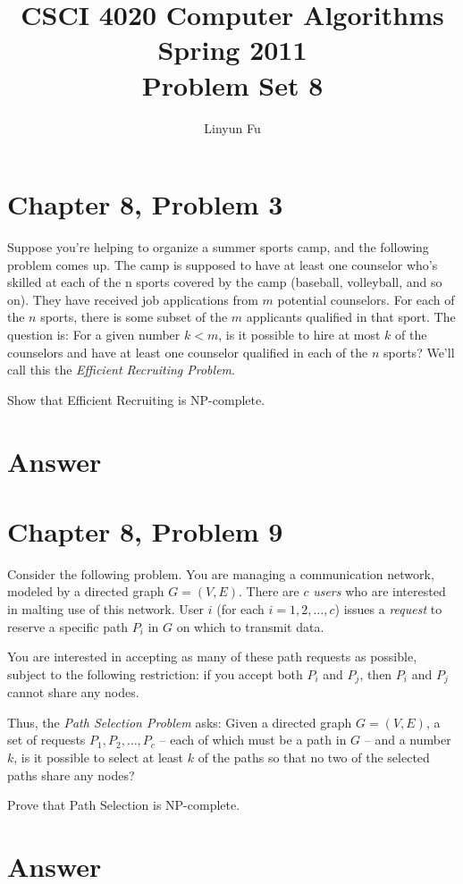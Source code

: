\documentclass[12pt,letterpaper]{article}
\author{Linyun Fu}
\title{CSCI 4020 Computer Algorithms Spring 2011\\
Problem Set 8}
\begin{document}
\maketitle
\section*{Chapter 8, Problem 3}
Suppose you're helping to organize a summer sports camp, and the
following problem comes up. The camp is supposed to have at least
one counselor who's skilled at each of the n sports covered by the camp
(baseball, volleyball, and so on). They have received job applications from
$m$ potential counselors. For each of the $n$ sports, there is some subset
of the $m$ applicants qualified in that sport. The question is: For a given
number $k < m$, is it possible to hire at most $k$ of the counselors and have
at least one counselor qualified in each of the $n$ sports? We'll call this the
{\em Efficient Recruiting Problem}.

Show that Efficient Recruiting is NP-complete.

\section*{Answer}

\section*{Chapter 8, Problem 9}
Consider the following problem. You are managing a communication
network, modeled by a directed graph $G = (V, E)$. There are $c$ {\em users} who
are interested in malting use of this network. User $i$ (for each $i = 1, 2, \dots, c$)
issues a {\em request} to reserve a specific path $P_i$ in $G$ on which to transmit
data.

You are interested in accepting as many of these path requests as
possible, subject to the following restriction: if you accept both $P_i$ and $P_j$,
then $P_i$ and $P_j$ cannot share any nodes.

Thus, the {\em Path Selection Problem} asks: Given a directed graph $G =
(V, E)$, a set of requests $P_1, P_2, \dots, P_c$ -- each of which must be a path in
$G$ -- and a number $k$, is it possible to select at least $k$ of the paths so that
no two of the selected paths share any nodes?

Prove that Path Selection is NP-complete.

\section*{Answer}
\end{document}
